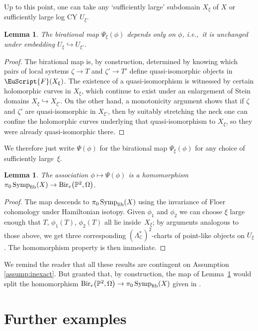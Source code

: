\documentclass[pdftex]{sigma}
\DeclareMathOperator{\Bir}{Bir}
\newcommand{\scrF}{\EuScript{F}}
\DeclareMathOperator{\Symp}{Symp}
\def\bP{\mathbb{P}}
\def\bC{\mathbb{C}}
\newtheorem{lem}[thm]{Lemma}
\theoremstyle{definition}
\numberwithin{equation}{section}
\begin{document}
Up to this point, one can take any `sufficiently large' subdomain $X_{\xi}$ of $X$ or sufficiently large log CY $U_{\xi}$.

\begin{lem}
The birational map $\Psi_{\xi}(\phi)$ depends only on $\phi$, i.e.,~it is unchanged under embedding $U_{\xi} \hookrightarrow U_{\xi'}$.
\end{lem}

\begin{proof} The birational map is, by construction, determined by knowing which pairs of local systems $\zeta \to T$ and $\zeta' \to T'$ define quasi-isomorphic objects in $\scrF(X_\xi)$. The existence of a quasi-isomorphism is witnessed by certain holomorphic curves in $X_{\xi}$, which continue to exist under an enlargement of Stein domains $X_{\xi} \hookrightarrow X_{\xi'}$. On the other hand, a monotonicity argument shows that if $\zeta$ and $\zeta'$ are quasi-isomorphic in $X_{\xi'}$, then by suitably stretching the neck one can confine the holomorphic curves underlying that quasi-isomorphism to $X_{\xi}$, so they were already quasi-isomorphic there.
\end{proof}

We therefore just write $\Psi(\phi)$ for the birational map $\Psi_{\xi}(\phi)$ for any choice of sufficiently large~$\xi$.

\begin{lem}\label{lem:done}
The association $\phi \mapsto \Psi(\phi)$ is a homomorphism $\pi_0\Symp_{\rm fib}(X) \to \Bir_e\bigl(\bP^2,\Omega\bigr)$.
\end{lem}

\begin{proof}
The map descends to $\pi_0\Symp_{\rm fib}(X)$ using the invariance of Floer cohomology under Hamiltonian isotopy. Given $\phi_1$ and $\phi_2$ we can choose $\xi$ large enough that $T$, $\phi_1(T)$, $\phi_2(T)$ all lie inside~$X_\xi$; by arguments analogous to those above, we get three corresponding $(\Lambda_\bC^*)^2$-charts of point-like objects on $U_{\xi}$. The homomorphism property is then immediate. \end{proof}

We remind the reader that all these results are contingent on Assumption \ref{assump:inexact}.
But granted that,
by construction, the map of Lemma~\ref{lem:done} would split the homomorphism $\Bir_e\bigl(\bP^2,\Omega\bigr) \to \pi_0\Symp_{\rm fib}(X)$ given in \cite{Keating-Ward}.

\section{Further examples}\label{sec:sporadic}
\end{document}
